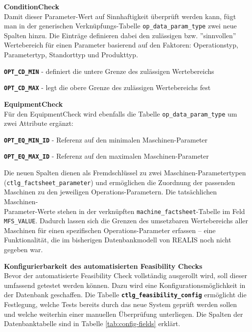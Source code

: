 \textbf{\gls{ConditionCheck}} \\
Damit dieser Parameter-Wert auf Sinnhaftigkeit überprüft werden kann, fügt man in der generischen Verknüpfungs-Tabelle \texttt{op\_data\_param\_type} zwei neue Spalten hinzu. Die Einträge definieren dabei den zulässigen bzw. ''sinnvollen'' Wertebereich für einen Parameter basierend auf den Faktoren: Operationstyp, Parametertyp, Standorttyp und Produkttyp.

\setlength{\leftskip}{1em} 
\textbf{\texttt{OPT\_CD\_MIN}} - definiert die untere Grenze des zulässigen Wertebereichs

\textbf{\texttt{OPT\_CD\_MAX}} - legt die obere Grenze des zulässigen Wertebereichs fest

\setlength{\leftskip}{0em} 

\textbf{\gls{EquipmentCheck}} \\
Für den \gls{EquipmentCheck} wird ebenfalls die Tabelle \texttt{op\_data\_param\_type} um zwei Attribute ergänzt:

\setlength{\leftskip}{1em} 
\textbf{\texttt{OPT\_EQ\_MIN\_ID}} - Referenz auf den minimalen Maschinen-Parameter

\textbf{\texttt{OPT\_EQ\_MAX\_ID}} - Referenz auf den maximalen Maschinen-Parameter

\setlength{\leftskip}{0em} 

Die neuen Spalten dienen als Fremdschlüssel zu zwei Maschinen-Parametertypen (\texttt{ctlg\_factsheet\_parameter}) und ermöglichen die Zuordnung der passenden Maschinen zu den jeweiligen Operations-Parametern. Die tatsächlichen Maschinen-\\Parameter-Werte stehen in der verknüpften \texttt{machine\_factsheet}-Tabelle im Feld \texttt{MFS\-\_VALUE}. Dadurch lassen sich die Grenzen des umsetzbaren Wertebereichs aller Maschinen für einen spezifischen Operations-Parameter erfassen – eine Funktionalität, die im bisherigen Datenbankmodell von REALIS noch nicht gegeben war.


\textbf{Konfigurierbarkeit des automatisierten Feasibility Checks} \\
Bevor der automatisierte Feasibility Check vollständig ausgerollt wird, soll dieser umfassend getestet werden können. Dazu wird eine Konfigurationsmöglichkeit in der Datenbank geschaffen. Die Tabelle \textbf{\texttt{ctlg\_feasibility\_config}} ermöglicht die Festlegung, welche Tests bereits durch das neue System geprüft werden sollen und welche weiterhin einer manuellen Überprüfung unterliegen. Die Spalten der Datenbanktabelle sind in Tabelle \ref{tab:config-fields} erklärt.


